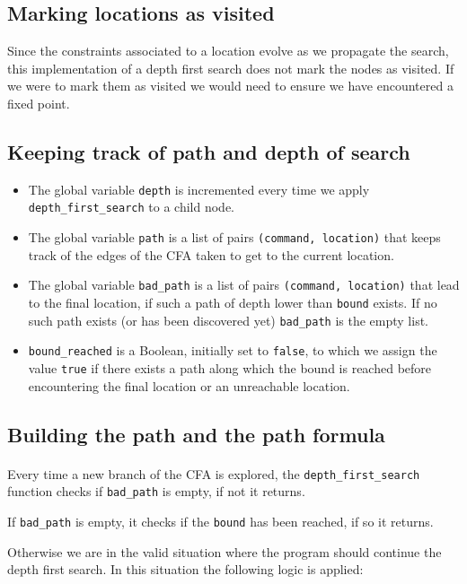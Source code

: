 \documentclass[letterpaper,12pt]{article}
\begin{document}
\subsection{Marking locations as visited}
Since the constraints associated to a location evolve as we propagate the search, this implementation of a depth first search does not mark the nodes as visited. If we were to mark them as visited we would need to ensure we have encountered a fixed point.


\subsection{Keeping track of path and depth of search}

\begin{itemize}
\item The global variable \texttt{depth} is incremented every time we apply \texttt{depth\_first\_search} to a child node.
\item The global variable \texttt{path} is a list of pairs \texttt{(command, location)} that keeps track of the edges of the CFA taken to get to the current location.
\item The global variable \texttt{bad\_path} is a list of pairs \texttt{(command, location)} that lead to the final location, if such a path of depth lower than \texttt{bound} exists. If no such path exists (or has been discovered yet) \texttt{bad\_path} is the empty list.
\item \texttt{bound\_reached} is a Boolean, initially set to \texttt{false}, to which we assign the value \texttt{true} if there exists a path along which the bound is reached before encountering the final location or an unreachable location.
\end{itemize}


\subsection{Building the path and the path formula}
\paragraph{}
Every time a new branch of the CFA is explored, the \texttt{depth\_first\_search} function checks if \texttt{bad\_path} is empty, if not it returns. 

If \texttt{bad\_path} is empty, it checks if the \texttt{bound} has been reached, if so it returns.

Otherwise we are in the valid situation where the program should continue the depth first search. In this situation the following logic is applied:
\end{document}
